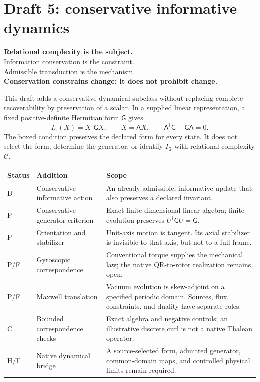 \section*{Draft 5: conservative informative dynamics}
\begin{principle}
\centering
\textbf{Relational complexity is the subject.}\\[2pt]
Information conservation is the constraint.\\[2pt]
Admissible transduction is the mechanism.\\[5pt]
\textbf{Conservation constrains change; it does not prohibit change.}
\end{principle}
This draft adds a conservative dynamical subclass without replacing complete recoverability by preservation of a scalar. In a supplied linear representation, a fixed positive-definite Hermitian form $\mathsf G$ gives
\[
I_{\mathsf G}(X)=X^\dagger\mathsf G X,\qquad
\dot X=\mathsf A X,\qquad
\boxed{\mathsf A^\dagger\mathsf G+\mathsf G\mathsf A=0}.
\]
The boxed condition preserves the declared form for every state. It does not select the form, determine the generator, or identify $I_{\mathsf G}$ with relational complexity $\mathcal C$.

\smallskip
\noindent\begin{tabularx}{\textwidth}{@{}p{}p{}X@{}}
\toprule
Status & Addition & Scope \\
\midrule
D & Conservative informative action & An already admissible, informative update that also preserves a declared invariant. \\
P & Conservative-generator criterion & Exact finite-dimensional linear algebra; finite evolution preserves $U^\dagger\mathsf G U=\mathsf G$. \\
P & Orientation and stabilizer & Unit-axis motion is tangent. Its axial stabilizer is invisible to that axis, but not to a full frame. \\
P/F & Gyroscopic correspondence & Conventional torque supplies the mechanical law; the native QR-to-rotor realization remains open. \\
P/F & Maxwell translation & Vacuum evolution is skew-adjoint on a specified periodic domain. Sources, flux, constraints, and duality have separate roles. \\
C & Bounded correspondence checks & Exact algebra and negative controls; an illustrative discrete curl is not a native Thalean operator. \\
H/F & Native dynamical bridge & A source-selected form, admitted generator, common-domain maps, and controlled physical limits remain required. \\
\bottomrule
\end{tabularx}

